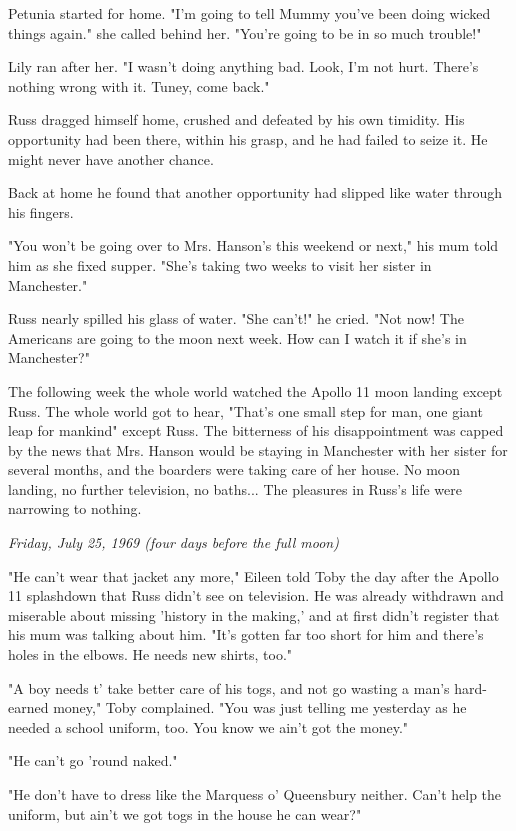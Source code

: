 \documentclass[a4paper,11pt]{article}
\begin{document}
Petunia started for home. "I'm going to tell Mummy you've been doing wicked things again." she called behind her. "You're going to be in so much trouble!"

Lily ran after her. "I wasn't doing anything bad. Look, I'm not hurt. There's nothing wrong with it. Tuney, come back."

Russ dragged himself home, crushed and defeated by his own timidity. His opportunity had been there, within his grasp, and he had failed to seize it. He might never have another chance.

Back at home he found that another opportunity had slipped like water through his fingers.

"You won't be going over to Mrs. Hanson's this weekend or next," his mum told him as she fixed supper. "She's taking two weeks to visit her sister in Manchester."

Russ nearly spilled his glass of water. "She can't!" he cried. "Not now! The Americans are going to the moon next week. How can I watch it if she's in Manchester?"

The following week the whole world watched the Apollo 11 moon landing except Russ. The whole world got to hear, "That's one small step for man, one giant leap for mankind" except Russ. The bitterness of his disappointment was capped by the news that Mrs. Hanson would be staying in Manchester with her sister for several months, and the boarders were taking care of her house. No moon landing, no further television, no baths... The pleasures in Russ's life were narrowing to nothing.

\emph{Friday, July 25, 1969 (four days before the full moon)}

"He can't wear that jacket any more," Eileen told Toby the day after the Apollo 11 splashdown that Russ didn't see on television. He was already withdrawn and miserable about missing 'history in the making,' and at first didn't register that his mum was talking about him. "It's gotten far too short for him and there's holes in the elbows. He needs new shirts, too."

"A boy needs t' take better care of his togs, and not go wasting a man's hard-earned money," Toby complained. "You was just telling me yesterday as he needed a school uniform, too. You know we ain't got the money."

"He can't go 'round naked."

"He don't have to dress like the Marquess o' Queensbury neither. Can't help the uniform, but ain't we got togs in the house he can wear?"
\end{document}
